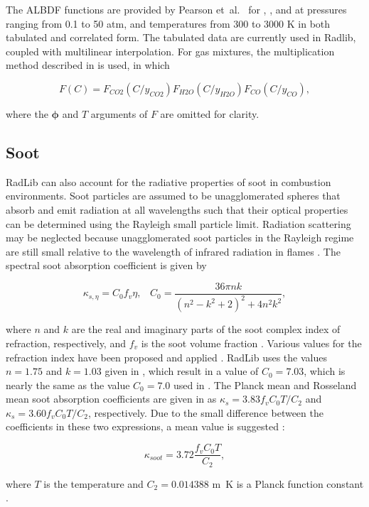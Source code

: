 \documentclass[preprint,12pt]{elsarticle}
\newcommand{\BS}{\boldsymbol}
\begin{document}
The ALBDF functions are provided by Pearson et~al.~\cite{Pearson_2014} for , , and  at pressures ranging from 0.1 to 50 atm, and temperatures from 300 to 3000 K in both tabulated and correlated form. The tabulated data are currently used in Radlib, coupled with multilinear interpolation. For gas mixtures, the multiplication method described in \cite{Solovjov_2000} is used, in which 
%
\begin{linenomath}
\begin{equation}
    F(C) = F_{CO2}(C/y_{CO2})F_{H2O}(C/y_{H2O})F_{CO}(C/y_{CO}), 
\end{equation}
\end{linenomath}
%
where the $\BS{\phi}$ and $T$ arguments of $F$ are omitted for clarity.


\subsection{Soot} \label{s:soot}

RadLib can also account for the radiative properties of soot in combustion environments. Soot particles are assumed to be unagglomerated spheres that absorb and emit radiation at all wavelengths such that their optical properties can be determined using the Rayleigh small particle limit. Radiation scattering may be neglected because unagglomerated soot particles in the Rayleigh regime are still small relative to the wavelength of infrared radiation in flames \cite{Brewster_1992,Solovjov_2001}. The spectral soot absorption coefficient is given by 
%
\begin{linenomath}
\begin{equation}
\label{e:soot1}
	\kappa_{s,\eta}=C_0 f_v \eta, \; \; \; C_0 = \frac{36\pi n k}{(n^2-k^2+2)^2+4n^2k^2},
\end{equation}
\end{linenomath}
%
where $n$ and $k$ are the real and imaginary parts of the soot complex index of refraction, respectively, and $f_v$ is the soot volume fraction \cite{Solovjov_2001,Modest_2013}. Various values for the refraction index have been proposed and applied \cite{Lee_1981,Stull_1960,Dalzell_1969,Howarth_1966,Chang_1990,Felske_1984,Williams_2007}. 
RadLib uses the values $n=1.75$ and $k=1.03$ given in \cite{Williams_2007}, which result in a value of $C_0=7.03$, which is nearly the same as the value $C_0=7.0$ used in \cite{Solovjov_2001}. 
The Planck mean and Rosseland mean soot absorption coefficients are given in \cite{Modest_2013} as $\kappa_s=3.83f_vC_0T/C_2$ and $\kappa_s=3.60f_vC_0T/C_2$, respectively.
Due to the small difference between the coefficients in these two expressions, a mean value is suggested \cite{Felske_1977,Modest_2013}:
%
\begin{linenomath}
\begin{equation}
\label{e:soot2}
	\kappa_{soot}=3.72\frac{f_vC_0T}{C_2},
\end{equation}
\end{linenomath}
%
where $T$ is the temperature and $C_2=0.014388$ \si{m.K} is a Planck function constant \cite{Modest_2013}. 
\end{document}
